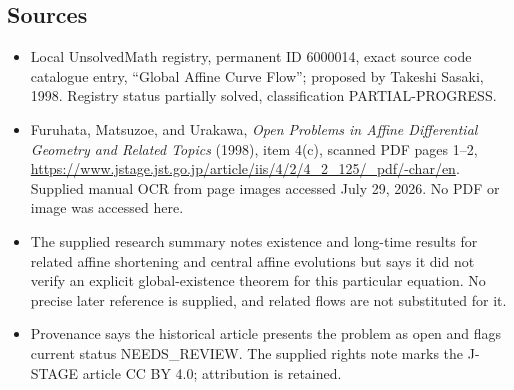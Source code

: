 \documentclass[11pt]{article}
\begin{document}
\subsection{Sources}
\begin{itemize}
\item Local UnsolvedMath registry, permanent ID 6000014, exact source code catalogue entry, ``Global Affine Curve Flow''; proposed by Takeshi Sasaki, 1998. Registry status partially solved, classification PARTIAL-PROGRESS.
\item Furuhata, Matsuzoe, and Urakawa, \emph{Open Problems in Affine Differential Geometry and Related Topics} (1998), item 4(c), scanned PDF pages 1--2, \url{https://www.jstage.jst.go.jp/article/iis/4/2/4_2_125/_pdf/-char/en}. Supplied manual OCR from page images accessed July 29, 2026. No PDF or image was accessed here.
\item The supplied research summary notes existence and long-time results for related affine shortening and central affine evolutions but says it did not verify an explicit global-existence theorem for this particular equation. No precise later reference is supplied, and related flows are not substituted for it.
\item Provenance says the historical article presents the problem as open and flags current status NEEDS\_REVIEW. The supplied rights note marks the J-STAGE article CC BY 4.0; attribution is retained.
\end{itemize}
\end{document}
